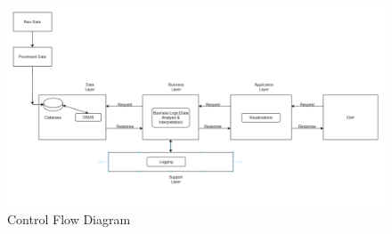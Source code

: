 \label{sec:control-flow}
\begin{figure}
	\centering
	\includegraphics[width=1.2\linewidth]{images/Control Flow.png}
	\caption{Control Flow Diagram}
	\label{fig:linear-regression}
\end{figure} 